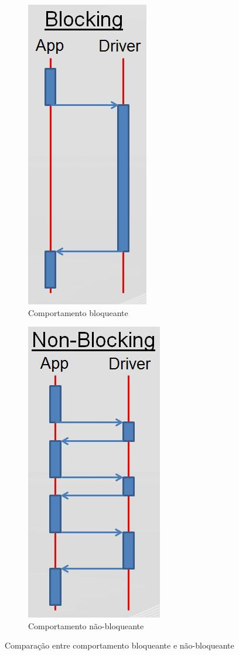 \documentclass{article}
\begin{document}
\begin{figure}[t]
\centering
\begin{subfigure}[b]{.5\textwidth}
  \centering
  \includegraphics[width=.4\linewidth]{BlockingSequence}
  \caption{Comportamento bloqueante}
  \label{fig:sub1}
\end{subfigure}%
\begin{subfigure}[b]{.5\textwidth}
  \centering
  \includegraphics[width=.4\linewidth]{NonBlockingSequence}
  \caption{Comportamento não-bloqueante}
  \label{fig:sub2}
\end{subfigure}
\caption{Comparação entre comportamento bloqueante e não-bloqueante}
\label{fig:test}
\end{figure}
\end{document}

